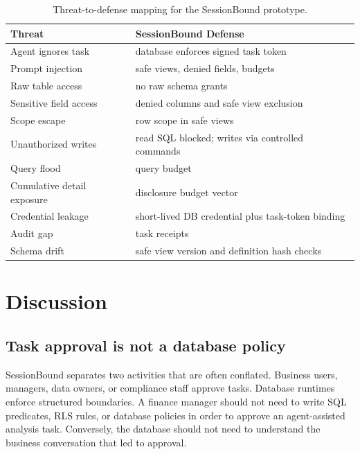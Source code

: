 \documentclass[
]{article}
\begin{document}
\begin{table}[t]
\centering
\small
\caption{Threat-to-defense mapping for the SessionBound prototype.}
\label{tab:threat-defense}
\begin{tabular}{@{}ll@{}}
\toprule
Threat & SessionBound Defense \\
\midrule
Agent ignores task & database enforces signed task token \\
Prompt injection & safe views, denied fields, budgets \\
Raw table access & no raw schema grants \\
Sensitive field access & denied columns and safe view exclusion \\
Scope escape & row scope in safe views \\
Unauthorized writes & read SQL blocked; writes via controlled
commands \\
Query flood & query budget \\
Cumulative detail exposure & disclosure budget vector \\
Credential leakage & short-lived DB credential plus task-token
binding \\
Audit gap & task receipts \\
Schema drift & safe view version and definition hash checks \\
\bottomrule
\end{tabular}
\end{table}


\hypertarget{discussion}{%
\section{Discussion}\label{discussion}}

\hypertarget{task-approval-is-not-a-database-policy}{%
\subsection{Task approval is not a database
policy}\label{task-approval-is-not-a-database-policy}}

SessionBound separates two activities that are often conflated.
Business users, managers, data owners, or compliance staff approve
tasks. Database runtimes enforce structured boundaries. A finance
manager should not need to write SQL predicates, RLS rules, or database
policies in order to approve an agent-assisted analysis task.
Conversely, the database should not need to understand the business
conversation that led to approval.
\end{document}
